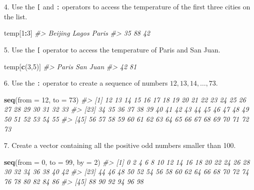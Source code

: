 \documentclass[
]{krantz}
\newenvironment{Shaded}{\begin{snugshade}}{\end{snugshade}}
\newcommand{\CommentTok}[1]{\textcolor[rgb]{0.37,0.37,0.37}{\textit{#1}}}
\newcommand{\DataTypeTok}[1]{\textcolor[rgb]{0.27,0.27,0.27}{#1}}
\newcommand{\DecValTok}[1]{\textcolor[rgb]{0.06,0.06,0.06}{#1}}
\newcommand{\KeywordTok}[1]{\textcolor[rgb]{0.27,0.27,0.27}{\textbf{#1}}}
\newcommand{\NormalTok}[1]{#1}
\newcommand{\OperatorTok}[1]{\textcolor[rgb]{0.43,0.43,0.43}{\textbf{#1}}}
\begin{document}
4. Use the \texttt{{[}} and \texttt{:} operators to access the temperature of the first three cities on the list.

\begin{Shaded}
\begin{Highlighting}[]
\NormalTok{temp[}\DecValTok{1}\OperatorTok{:}\DecValTok{3}\NormalTok{]}
\CommentTok{#> Beijing   Lagos   Paris }
\CommentTok{#>      35      88      42}
\end{Highlighting}
\end{Shaded}

5. Use the \texttt{{[}} operator to access the temperature of Paris and San Juan.

\begin{Shaded}
\begin{Highlighting}[]
\NormalTok{temp[}\KeywordTok{c}\NormalTok{(}\DecValTok{3}\NormalTok{,}\DecValTok{5}\NormalTok{)]}
\CommentTok{#>    Paris San Juan }
\CommentTok{#>       42       81}
\end{Highlighting}
\end{Shaded}

6. Use the \texttt{:} operator to create a sequence of numbers \(12,13,14,\dots,73\).

\begin{Shaded}
\begin{Highlighting}[]
\KeywordTok{seq}\NormalTok{(}\DataTypeTok{from =} \DecValTok{12}\NormalTok{, }\DataTypeTok{to =} \DecValTok{73}\NormalTok{)}
\CommentTok{#>  [1] 12 13 14 15 16 17 18 19 20 21 22 23 24 25 26 27 28 29 30 31 32 33}
\CommentTok{#> [23] 34 35 36 37 38 39 40 41 42 43 44 45 46 47 48 49 50 51 52 53 54 55}
\CommentTok{#> [45] 56 57 58 59 60 61 62 63 64 65 66 67 68 69 70 71 72 73}
\end{Highlighting}
\end{Shaded}

7. Create a vector containing all the positive odd numbers smaller than 100.

\begin{Shaded}
\begin{Highlighting}[]
\KeywordTok{seq}\NormalTok{(}\DataTypeTok{from =} \DecValTok{0}\NormalTok{, }\DataTypeTok{to =} \DecValTok{99}\NormalTok{, }\DataTypeTok{by =} \DecValTok{2}\NormalTok{)}
\CommentTok{#>  [1]  0  2  4  6  8 10 12 14 16 18 20 22 24 26 28 30 32 34 36 38 40 42}
\CommentTok{#> [23] 44 46 48 50 52 54 56 58 60 62 64 66 68 70 72 74 76 78 80 82 84 86}
\CommentTok{#> [45] 88 90 92 94 96 98}
\end{Highlighting}
\end{Shaded}
\end{document}
